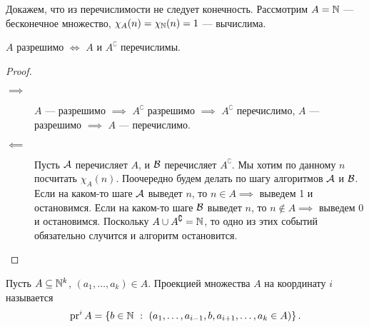 Докажем, что из перечислимости не следует конечность.
Рассмотрим $A = \N$ --- бесконечное множество, $\chi_{A}(n) = \chi_{\N}(n) = 1$ --- вычислима.

\begin{theorem}[Поста]
    $A$ разрешимо $\iff$ $A$ и $A^{\complement}$ перечислимы.
\end{theorem}
\begin{proof}$ $
    \begin{description}
        \item[$\implies$] $A$ --- разрешимо $\implies$ $A^{\complement}$ разрешимо $\implies$ $A^{\complement}$ перечислимо, $A$ --- разрешимо $\implies$ $A$ --- перечислимо.
        \item[$\impliedby$] Пусть $\AA$ перечисляет $A$, и $\BB$ перечисляет $A^{\complement}$.
        Мы хотим по данному $n$ посчитать $\chi_{A}\left(n\right)$.
        Поочередно будем делать по шагу алгоритмов $\AA$ и $\BB$.
        Если на каком-то шаге $\AA$ выведет $n$, то $n \in A \implies$ выведем 1 и остановимся.
        Если на каком-то шаге $\BB$ выведет $n$, то $n \notin A \implies$ выведем 0 и остановимся.
        Поскольку $A \cup A^{\complement} = \N$, то одно из этих событий обязательно случится и алгоритм остановится.
    \end{description}
\end{proof}

\begin{definition}
    Пусть $A \subseteq \N^{k}$, $\left(a_{1}, \ldots, a_{k}\right) \in A$.
    Проекцией множества $A$ на координату $i$ называется
    $$
        \pr^{i} A = \left\{b \in \N~:~\left(a_{1}, \ldots, a_{i - 1}, b, a_{i + 1}, \ldots, a_{k} \in A\right)\right\}.
    $$
\end{definition}

